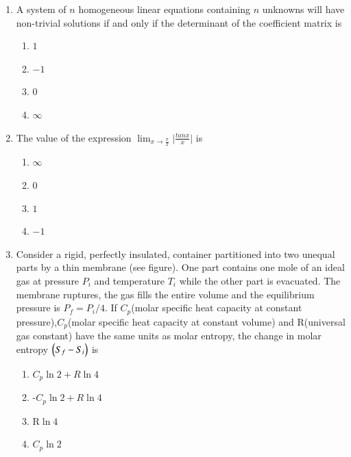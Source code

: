 \documentclass[journal,12pt,onecolumn]{IEEEtran}
\theoremstyle{remark}
\begin{document}
\begin{enumerate}
    \item A system of $n$ homogeneous linear equations containing $n$ unknowns will have non-trivial solutions if and only if the determinant of the coefficient matrix is

\begin{multicols}{4}
    \begin{enumerate}
        \item $1$
        \item $-1$
        \item $0$
        \item $\infty$
    \end{enumerate}
\end{multicols}

    \item The value of the expression $\lim_{x\to\frac{\pi}{2}}\big|\frac{tan x}{x}\big|$  is

\begin{multicols}{4}
    \begin{enumerate}
        \item $\infty$
        \item $0$
        \item $1$
        \item $-1$
    \end{enumerate}
\end{multicols}
    \item Consider a rigid, perfectly insulated, container partitioned into two unequal parts by a thin membrane (see figure). One part contains one mole of an ideal gas at pressure {$P_i$} and temperature $T_i$ while the other part is evacuated. The membrane ruptures, the gas fills the entire volume and the equilibrium pressure is $P_f = P_i/4$. If $C_p$(molar specific heat capacity at constant pressure),$C_p$(molar specific heat capacity at constant volume) and R(universal gas constant) have the same units as molar entropy, the change in molar entropy $\left(S_f - S_i\right)$ is

    

    \begin{enumerate}
        \item $C_p\ln{2} + R\ln{4}$
        \item -$C_p \ln{2} + R\ln{4}$
        \item R$\ln{4}$
        \item $C_p \ln{2}$
    \end{enumerate}


\end{enumerate}
\end{document}
